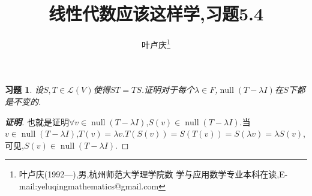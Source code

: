 ﻿\documentclass[a4paper]{article}
\newtheorem*{exa}{习题}
\newenvironment{example}
{\bigskip\begin{mdframed}\begin{exa}}
    {\end{exa}\end{mdframed}\bigskip}
\begin{document}
\title{\huge{\bf{线性代数应该这样学,习题5.4}}}
\author{\small{叶卢庆\footnote{叶卢庆(1992---),男,杭州师范大学理学院数
      学与应用数学专业本科在读,E-mail:yeluqingmathematics@gmail.com}}}
\maketitle\ni
\begin{example}
  设$S,T\in \mathcal{L}(V)$使得$ST=TS$.证明对于每个$\lambda\in
  F$,$\operatorname{null}(T-\lambda I)$在$S$下都是不变的.
\end{example}
\begin{proof}[\textbf{证明}]
  也就是证明$\forall v\in \operatorname{null}(T-\lambda I)$,$S(v)\in
  \operatorname{null}(T-\lambda I)$.当$v\in
  \operatorname{null}(T-\lambda I)$,$T(v)=\lambda
  v$.$T(S(v))=S(T(v))=S(\lambda v)=\lambda S(v)$,可见,$S(v)\in
  \operatorname{null}(T-\lambda I)$.
\end{proof}
\end{document}
